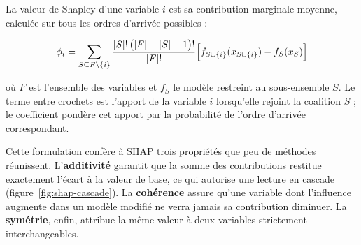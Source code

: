 La valeur de Shapley d'une variable $i$ est sa contribution marginale moyenne, calculée
sur tous les ordres d'arrivée possibles :

\begin{equation}
\phi_i = \sum_{S \subseteq F \setminus \{i\}}
         \frac{|S|!\,\bigl(|F| - |S| - 1\bigr)!}{|F|!}
         \Bigl[ f_{S \cup \{i\}}(x_{S \cup \{i\}}) - f_S(x_S) \Bigr]
\label{eq:shapley}
\end{equation}

\noindent où $F$ est l'ensemble des variables et $f_S$ le modèle restreint au
sous-ensemble $S$. Le terme entre crochets est l'apport de la variable $i$ lorsqu'elle
rejoint la coalition $S$ ; le coefficient pondère cet apport par la probabilité de
l'ordre d'arrivée correspondant.

Cette formulation confère à SHAP trois propriétés que peu de méthodes réunissent.
L'\textbf{additivité} garantit que la somme des contributions restitue exactement
l'écart à la valeur de base, ce qui autorise une lecture en cascade
(figure~\ref{fig:shap-cascade}). La \textbf{cohérence} assure qu'une variable dont
l'influence augmente dans un modèle modifié ne verra jamais sa contribution diminuer.
La \textbf{symétrie}, enfin, attribue la même valeur à deux variables strictement
interchangeables.

